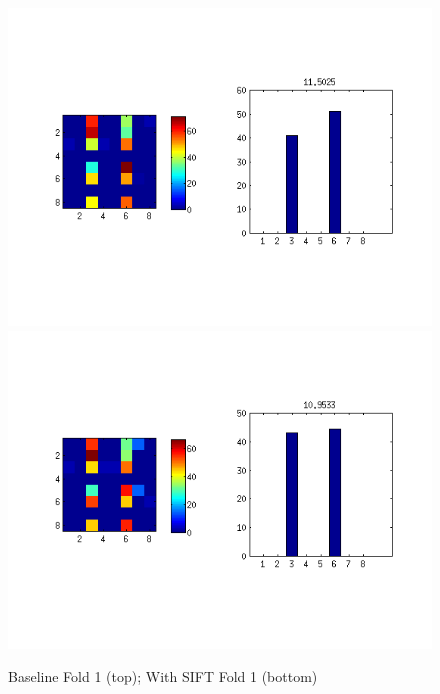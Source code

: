 \documentclass[10pt,twocolumn,letterpaper]{article}
\begin{document}
\begin{figure}[p]
 \centering
 \includegraphics[scale=0.5]{../../../evaluation/baseline/fold1_1e5.png}
 \includegraphics[scale=0.5]{../../../evaluation/feature-sift/fold1_1e5.png}
 \caption{Baseline Fold 1 (top); With SIFT Fold 1 (bottom)}
 \label{figure:withSiftFold1}
\end{figure}
\end{document}
